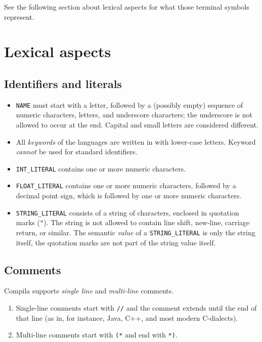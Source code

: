 \documentclass[11pt]{article}
\begin{document}
See the following section about lexical aspects for what those terminal
symbols represent.

\section{Lexical aspects}
\label{sec:orgbe222ac}
\subsection{Identifiers and literals}
\label{sec:org3ac8323}

\begin{itemize}
\item \texttt{NAME} must start with a letter, followed by a (possibly empty) sequence
of numeric characters, letters, and underscore characters; the
underscore is not allowed to occur at the end. Capital and small letters
are considered different.

\item All \emph{keywords} of the languages are written in with lower-case
letters. Keyword \emph{cannot} be used for standard identifiers.

\item \texttt{INT\_LITERAL} contains one or more numeric characters.

\item \texttt{FLOAT\_LITERAL} contains one or more numeric characters, followed by a
decimal point sign, which is followed by one or more numeric characters.

\item \texttt{STRING\_LITERAL} consists of a string of characters, enclosed in
quotation marks (\texttt{"}).  The string is not allowed to contain line shift,
new-line, carriage return, or similar. The semantic \emph{value} of a
\texttt{STRING\_LITERAL} is only the string itself, the quotation marks are not
part of the string value itself.
\end{itemize}


\subsection{Comments}
\label{sec:org2b172f6}

Compila supports \emph{single line} and \emph{multi-line} comments.


\begin{enumerate}
\item Single-line comments start with \texttt{//} and the comment extends until the
end of that line (as in, for instance, Java, C++, and most modern
C-dialects).
\item Multi-line comments start with \texttt{(*} and end with \texttt{*)}.
\end{enumerate}
\end{document}
